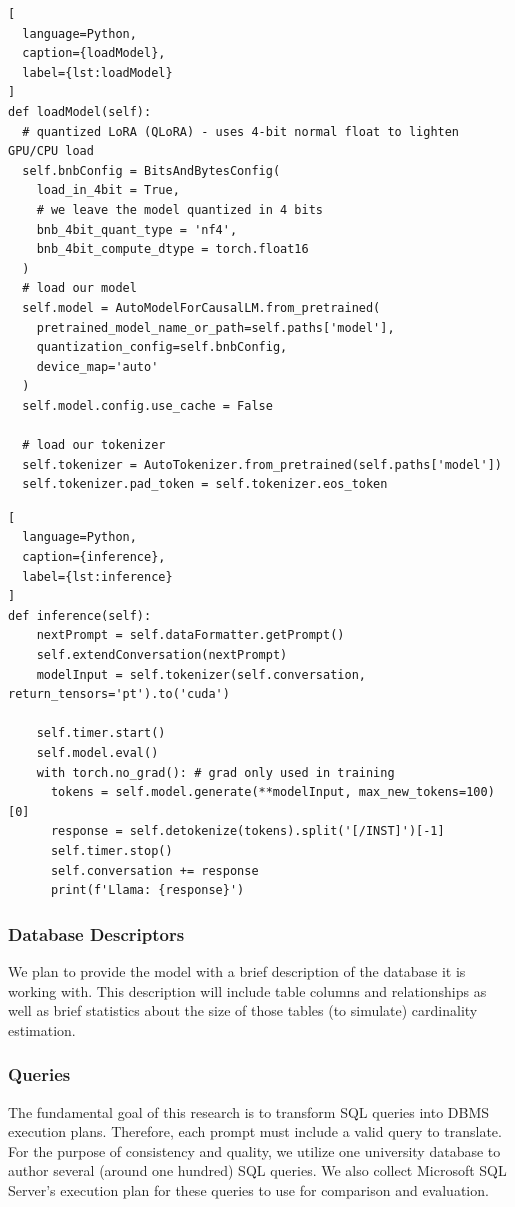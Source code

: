 \begin{lstlisting}[
  language=Python,
  caption={loadModel},
  label={lst:loadModel}
]
def loadModel(self):
  # quantized LoRA (QLoRA) - uses 4-bit normal float to lighten GPU/CPU load
  self.bnbConfig = BitsAndBytesConfig(
    load_in_4bit = True,
    # we leave the model quantized in 4 bits
    bnb_4bit_quant_type = 'nf4',
    bnb_4bit_compute_dtype = torch.float16
  )
  # load our model
  self.model = AutoModelForCausalLM.from_pretrained(
    pretrained_model_name_or_path=self.paths['model'],
    quantization_config=self.bnbConfig,
    device_map='auto'
  )
  self.model.config.use_cache = False

  # load our tokenizer
  self.tokenizer = AutoTokenizer.from_pretrained(self.paths['model'])
  self.tokenizer.pad_token = self.tokenizer.eos_token
\end{lstlisting}

\begin{lstlisting}[
  language=Python,
  caption={inference},
  label={lst:inference}
]
def inference(self):
    nextPrompt = self.dataFormatter.getPrompt()
    self.extendConversation(nextPrompt)
    modelInput = self.tokenizer(self.conversation, return_tensors='pt').to('cuda')

    self.timer.start()
    self.model.eval()
    with torch.no_grad(): # grad only used in training
      tokens = self.model.generate(**modelInput, max_new_tokens=100)[0]
      response = self.detokenize(tokens).split('[/INST]')[-1]
      self.timer.stop()
      self.conversation += response
      print(f'Llama: {response}')
\end{lstlisting}

\subsubsection{Database Descriptors}
We plan to provide the model with a brief description of the database it is working with. This description will include table columns and relationships as well as brief statistics about the size of those tables (to simulate) cardinality estimation.

\subsubsection{Queries}
The fundamental goal of this research is to transform SQL queries into DBMS execution plans. Therefore, each prompt must include a valid query to translate. For the purpose of consistency and quality, we utilize one university database to author several (around one hundred) SQL queries. We also collect Microsoft SQL Server's execution plan for these queries to use for comparison and evaluation.

